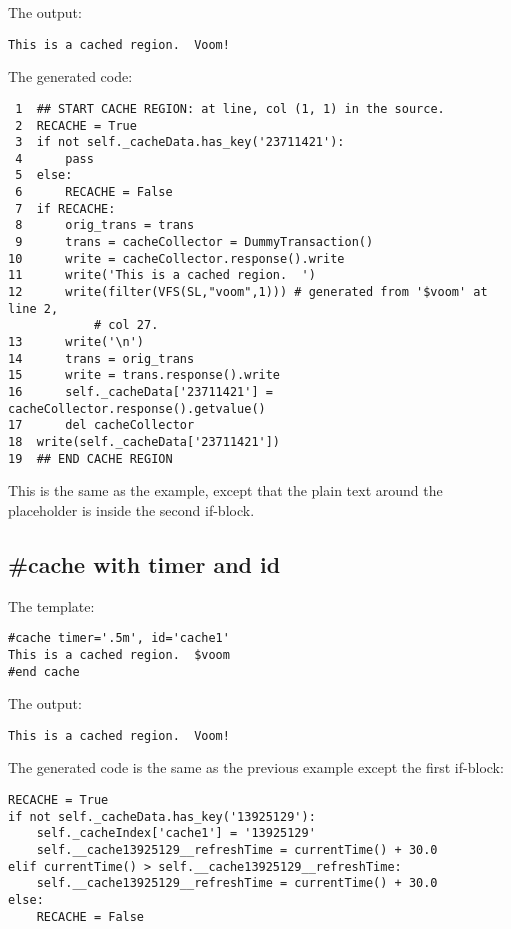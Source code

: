 The output:
\begin{verbatim}
This is a cached region.  Voom!
\end{verbatim}

The generated code:
\begin{verbatim}
 1  ## START CACHE REGION: at line, col (1, 1) in the source.
 2  RECACHE = True
 3  if not self._cacheData.has_key('23711421'):
 4      pass
 5  else:
 6      RECACHE = False
 7  if RECACHE:
 8      orig_trans = trans
 9      trans = cacheCollector = DummyTransaction()
10      write = cacheCollector.response().write
11      write('This is a cached region.  ')
12      write(filter(VFS(SL,"voom",1))) # generated from '$voom' at line 2, 
            # col 27.
13      write('\n')
14      trans = orig_trans
15      write = trans.response().write
16      self._cacheData['23711421'] = cacheCollector.response().getvalue()
17      del cacheCollector
18  write(self._cacheData['23711421'])
19  ## END CACHE REGION
\end{verbatim}

This is the same as the  example, except that the plain text
around the placeholder is inside the second if-block.  

\subsection{\#cache with timer and id}
\label{cache.directive.timer}

The template:
\begin{verbatim}
#cache timer='.5m', id='cache1'
This is a cached region.  $voom
#end cache
\end{verbatim}

The output:
\begin{verbatim}
This is a cached region.  Voom!
\end{verbatim}

The generated code is the same as the previous example except the first
if-block:
\begin{verbatim}
RECACHE = True
if not self._cacheData.has_key('13925129'):
    self._cacheIndex['cache1'] = '13925129'
    self.__cache13925129__refreshTime = currentTime() + 30.0
elif currentTime() > self.__cache13925129__refreshTime:
    self.__cache13925129__refreshTime = currentTime() + 30.0
else:
    RECACHE = False
\end{verbatim}

